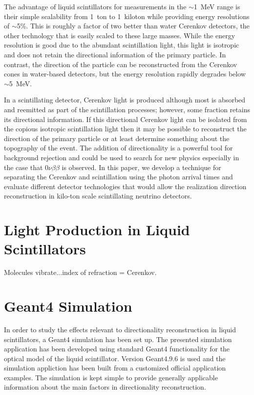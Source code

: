 \documentclass[aps,prc,twocolumn,groupedaddress,showpacs,amsmath,amssymb,floatfix,superscriptaddress]{revtex4}
\begin{document}
The advantage of liquid scintillators for measurements in the $\sim$1~MeV range is their simple scalability from  1~ton to 1~kiloton while providing energy resolutions of $\sim$5\%. This is roughly a factor of two better than water Cerenkov detectors, the other technology that is easily scaled to these  large masses. While the energy resolution is good due to the abundant scintillation light, this light is isotropic and does not retain the directional information of the primary particle.   In contrast, the direction of the particle can be reconstructed from the Cerenkov cones in water-based detectors, but the energy resolution rapidly degrades below $\sim$5~MeV.

In a scintillating detector, Cerenkov light is produced although most is absorbed and reemitted as part of the scintillation processes; however, some fraction retains its directional information. If this directional Cerenkov light can be isolated from the copious isotropic scintillation light then it may be possible to reconstruct the direction of the primary particle or at least determine something about the topography of the event. The addition of directionality is a powerful tool for background rejection and could be used to search for new physics especially in the case that $0\nu\beta\beta$ is observed. In this paper, we develop a technique for separating the Cerenkov and scintillation using the photon arrival times and evaluate different detector technologies that would allow the realization direction reconstruction in kilo-ton scale scintillating neutrino detectors.


\section{Light Production in Liquid Scintillators}
Molecules vibrate...index of refraction = Cerenkov.

\section{Geant4 Simulation}
In order to study the effects relevant to directionality reconstruction in liquid scintillators, a Geant4 \cite{geant4one,geant4two} simulation has been set up. The presented simulation application has been developed using standard Geant4 functionality for the optical model of the liquid scintillator. Version Geant4.9.6 is used and the simulation appliction has been built from a customized official application examples. The simulation is kept simple to provide generally applicable information about the main factors in directionality reconstruction. 
\end{document}
